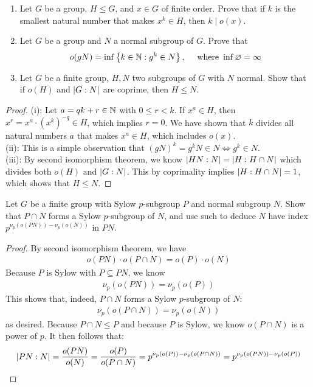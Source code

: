 \documentclass{report}
\begin{document}
\begin{question}{}{}
\begin{enumerate}[label=(\roman*)]
  \item Let $G$ be a group, $H\leq G$, and $x\in G$ of finite order. Prove that if $k$ is the smallest natural number that makes $x^k \in H$, then $k\mid o(x)$. 
  \item Let $G$ be a group and $N$ a normal subgroup of  $G$. Prove that  
\begin{align*}
o(gN)= \inf \left\{ k\in\mathbb{N}: g^k \in N \right\},\quad \text{ where }\inf \varnothing = \infty
\end{align*}
\item Let $G$ be a finite group, $H,N$ two subgroups of $G$ with $N$ normal. Show that if  $o(H)$ and $\left|G:N\right|$ are coprime, then $H \leq N$. 
\end{enumerate}
\end{question}
\begin{proof}
  (i):  Let $a=qk+r\in\mathbb{N}$ with $0\leq r<k$. If $x^a \in H$, then  $x^r=x^a\cdot (x^{k})^{-q}\in H$, which implies $r=0$. We have shown that $k$ divides all natural numbers  $a$ that makes  $x^a \in H$, which includes $o(x)$. \\

(ii): This is a simple observation that $(gN)^k=g^kN\in N\iff g^k \in N$. \\

(iii): By second isomorphism theorem, we know $\left|HN: N\right|=\left|H: H \cap N\right|$ which divides both $o(H)$ and $\left|G:N\right|$. This by coprimality implies $\left|H:H \cap N\right|=1$, which shows that $H\leq N$.  
\end{proof}
\begin{question}{}{}
Let $G$ be a finite group with Sylow $p$-subgroup $P$ and normal subgroup  $N$. Show that $P \cap N$ forms a Sylow $p$-subgroup of  $N$, and use such to deduce $N$ have index $p^{\nu _p(o(PN))-\nu _p(o(N))}$ in $PN$.
\end{question}
\begin{proof}
By second isomorphism theorem, we have 
\begin{align*}
o(PN)\cdot o(P\cap N)= o(P) \cdot o(N)
\end{align*}
Because $P$ is Sylow with $P \subseteq PN$, we know 
\begin{align*}
\nu_p(o(PN))=\nu _p (o(P))
\end{align*}
This shows that, indeed, $P\cap N$ forms a Sylow $p$-subgroup of $N$: 
\begin{align*}
\nu_p(o(P\cap N))= \nu _p (o(N))
\end{align*}
as desired. Because $P \cap N\leq P$ and because $P$ is Sylow, we know $o(P\cap N)$ is a power of $p$. It then follows that: 
\begin{align*}
\left|PN: N\right|=  \frac{o(PN)}{o(N)}= \frac{o(P)}{o(P\cap N)}= p^{\nu_p(o(P))- \nu_p(o(P\cap N))}= p^{\nu_p(o(PN))-\nu_p(o(P))} 
\end{align*}
\end{proof}
\end{document}
